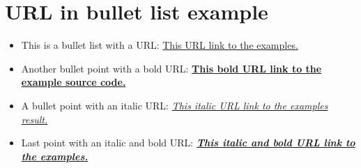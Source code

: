 \documentclass[a4paper]{report}
\begin{document}
\chapter{URL in bullet list example}
\begin{itemize}
\item This is a bullet list with a URL: \href{https://github.com/tom-bjorkholm/mformat/blob/master/example/src}{This URL link to the examples.}
\item Another bullet point with a bold URL: \textbf{\href{https://github.com/tom-bjorkholm/mformat/blob/master/example/src}{This bold URL link to the example source code.}}
\item A bullet point with an italic URL: \textit{\href{https://github.com/tom-bjorkholm/mformat/blob/master/example/result}{This italic URL link to the examples result.}}
\item Last point with an italic and bold URL: \textit{\textbf{\href{https://github.com/tom-bjorkholm/mformat/blob/master/example/src}{This italic and bold URL link to the examples.}}}
\end{itemize}
\end{document}
